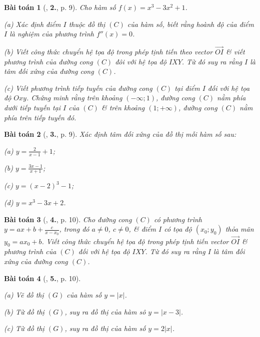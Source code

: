 \documentclass[12pt]{article}
\numberwithin{equation}{section}
\newtheorem{baitoan}{Bài toán}[section]
\begin{document}
\begin{baitoan}[\cite{TL_chuyen_Toan_Giai_Tich_12}, \textbf{2.}, p. 9]
	Cho hàm số $f(x) = x^3 - 3x^2 + 1$.
	\begin{enumerate*}
		\item[(a)] Xác định điểm $I$ thuộc đồ thị $(C)$ của hàm số, biết rằng hoành độ của điểm $I$ là nghiệm của phương trình $f''(x) = 0$.
		\item[(b)] Viết công thức chuyển hệ tọa độ trong phép tịnh tiến theo vector $\overrightarrow{OI}$ \& viết phương trình của đường cong $(C)$ đôi với hệ tọa độ $IXY$. Từ đó suy ra rằng $I$ là tâm đối xứng của đường cong $(C)$.
		\item[(c)] Viết phương trình tiếp tuyến của đường cong $(C)$ tại điểm $I$ đối với hệ tọa độ $Oxy$. Chứng minh rằng trên khoảng $(-\infty;1)$, đường cong $(C)$ nằm phía dưới tiếp tuyến tại $I$ của $(C)$ \& trên khoảng $(1;+\infty)$, đường cong $(C)$ nằm phía trên tiếp tuyến đó.
	\end{enumerate*}
\end{baitoan}

\begin{baitoan}[\cite{TL_chuyen_Toan_Giai_Tich_12}, \textbf{3.}, p. 9]
	Xác định tâm đối xứng của đồ thị mỗi hàm số sau:
	\begin{enumerate*}
		\item[(a)] $y = \frac{2}{x - 1} + 1$;
		\item[(b)] $y = \frac{3x - 1}{x + 1}$;
		\item[(c)] $y = (x - 2)^3 - 1$;
		\item[(d)] $y = x^3 - 3x + 2$.
	\end{enumerate*}
\end{baitoan}

\begin{baitoan}[\cite{TL_chuyen_Toan_Giai_Tich_12}, \textbf{4.}, p. 10]
	Cho đường cong $(C)$ có phương trình $y = ax + b + \frac{c}{x - x_0}$, trong đó $a\ne 0$, $c\ne 0$, \& điểm $I$ có tọa độ $(x_0;y_0)$ thỏa mãn $y_0 = ax_0 + b$. Viết công thức chuyển hệ tọa độ trong phép tịnh tiến vector $\overrightarrow{OI}$ \& phương trình của $(C)$ đối với hệ tọa độ $IXY$. Từ đó suy ra rằng $I$ là tâm đối xứng của đường cong $(C)$.
\end{baitoan}

\begin{baitoan}[\cite{TL_chuyen_Toan_Giai_Tich_12}, \textbf{5.}, p. 10]
	\begin{enumerate*}
		\item[(a)] Vẽ đồ thị $(G)$ của hàm số $y = |x|$.
		\item[(b)] Từ đồ thị $(G)$, suy ra đồ thị của hàm sô $y = |x - 3|$.
		\item[(c)] Từ đồ thị $(G)$, suy ra đồ thị của hàm số $y = 2|x|$.
	\end{enumerate*}
\end{baitoan}
\end{document}
